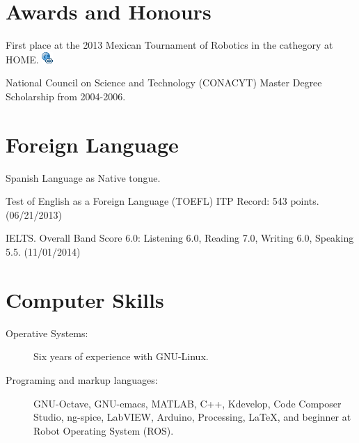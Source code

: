 \documentclass[10pt]{article}
\begin{document}
    
                \section*{Awards and Honours}
First place at the 2013 Mexican Tournament of Robotics in the cathegory at HOME. \href{http://ccc.inaoep.mx/~tmr2013/index.php}
{\includegraphics[scale=.3]{link_url_icon}}


		National Council on Science and Technology (CONACYT) Master Degree Scholarship from 2004-2006.






    
    \section*{Foreign Language}
 Spanish Language as Native tongue. 
 
 Test of English as a Foreign Language (TOEFL) ITP Record: 543 points. (06/21/2013)
 
 IELTS. Overall Band Score 6.0: Listening 6.0, Reading 7.0, Writing 6.0, Speaking 5.5. (11/01/2014)



    
    
    \section*{Computer Skills}
    	\begin{description}
\item[Operative Systems:] Six years of experience with GNU-Linux. 
		\item[Programing and markup languages:] {GNU-Octave, GNU-emacs, MATLAB, C++, Kdevelop, 
		Code Composer Studio, ng-spice, LabVIEW, Arduino, Processing,
\LaTeX, and beginner at Robot Operating System (ROS).
}  
	\end{description} %
    
\end{document}
